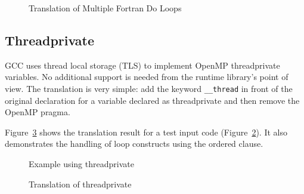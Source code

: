 \begin{figure}[htbp]
{\indent
  {\mySmallFontSize
    \begin{latexonly}
    
    \end{latexonly}
    \begin{htmlonly}
    
    \end{htmlonly}
  }
}
\caption{Translation of Multiple Fortran Do Loops}
\label{Manual:omp:do-multiple-trans-f}
\end{figure}


\clearpage
\subsection{Threadprivate}
GCC uses thread local storage (TLS) to implement OpenMP threadprivate variables. 
No additional support is needed from the runtime library's point of view. 
The translation is very simple: add the keyword \lstinline{__thread} in front of the original declaration for a variable declared as threadprivate and then remove the OpenMP pragma. 

Figure~\ref{Manual:omp:threadprivate-trans} shows the translation result for a test input code (Figure~\ref{Manual:omp:threadprivate}). It also demonstrates the handling of loop constructs using the ordered clause.

\lstset{language=C,basicstyle=\scriptsize}
\begin{figure}[htbp]
{\indent
  {\mySmallFontSize
    \begin{latexonly}
    
    \end{latexonly}
    \begin{htmlonly}
    
    \end{htmlonly}
  }
}
\caption{Example using threadprivate}
\label{Manual:omp:threadprivate}
\end{figure}

\begin{figure}[htbp]
{\indent
  {\mySmallFontSize
    \begin{latexonly}
    
    \end{latexonly}
    \begin{htmlonly}
    
    \end{htmlonly}
  }
}
\caption{Translation of threadprivate}
\label{Manual:omp:threadprivate-trans}
\end{figure}


